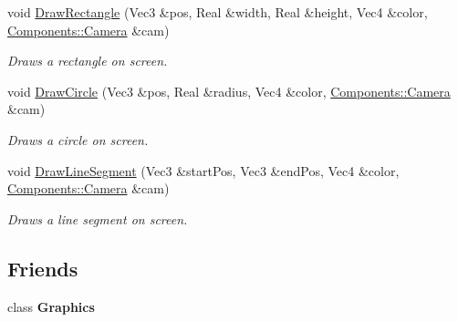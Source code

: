 \begin{DoxyCompactItemize}
\item 
void \hyperlink{classDCEngine_1_1Systems_1_1GraphicsGL_abfb20b4ea47d2643f330b760b05cf18e}{Draw\-Rectangle} (Vec3 \&pos, Real \&width, Real \&height, Vec4 \&color, \hyperlink{classDCEngine_1_1Components_1_1Camera}{Components\-::\-Camera} \&cam)
\begin{DoxyCompactList}\small\item\em Draws a rectangle on screen. \end{DoxyCompactList}\item 
void \hyperlink{classDCEngine_1_1Systems_1_1GraphicsGL_a55134ce31477c1f6071d7c0ac9d99e46}{Draw\-Circle} (Vec3 \&pos, Real \&radius, Vec4 \&color, \hyperlink{classDCEngine_1_1Components_1_1Camera}{Components\-::\-Camera} \&cam)
\begin{DoxyCompactList}\small\item\em Draws a circle on screen. \end{DoxyCompactList}\item 
void \hyperlink{classDCEngine_1_1Systems_1_1GraphicsGL_a2c49099c6b0dcf7b2c4ededfcea7f259}{Draw\-Line\-Segment} (Vec3 \&start\-Pos, Vec3 \&end\-Pos, Vec4 \&color, \hyperlink{classDCEngine_1_1Components_1_1Camera}{Components\-::\-Camera} \&cam)
\begin{DoxyCompactList}\small\item\em Draws a line segment on screen. \end{DoxyCompactList}\end{DoxyCompactItemize}
\subsection*{Friends}
\begin{DoxyCompactItemize}
\item 
\hypertarget{classDCEngine_1_1Systems_1_1GraphicsGL_ae5cfe0c0e0b06d536d5814bd1ff4818f}{class {\bfseries Graphics}}\label{classDCEngine_1_1Systems_1_1GraphicsGL_ae5cfe0c0e0b06d536d5814bd1ff4818f}

\end{DoxyCompactItemize}


